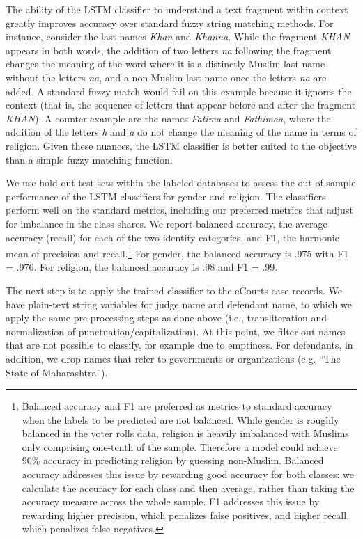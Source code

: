 \documentclass[12pt,english]{article}
\begin{document}
The ability of the LSTM classifier to understand a text fragment within context greatly improves accuracy over standard fuzzy string matching methods. For instance, consider the last names \textit{Khan} and \textit{Khanna}. While the fragment \textit{KHAN} appears in both words, the addition of two letters \textit{na} following the fragment changes the meaning of the word where it is a distinctly Muslim last name without the letters \textit{na}, and a non-Muslim last name once the letters \textit{na} are added. A standard fuzzy match would fail on this example because it ignores the context (that is, the sequence of letters that appear before and after the fragment \textit{KHAN}). A counter-example are the names \textit{Fatima} and \textit{Fathimaa}, where the addition of the letters \textit{h} and \textit{a} do not change the meaning of the name in terms of religion. Given these nuances, the LSTM classifier is better suited to the objective than a simple fuzzy matching function.

We use hold-out test sets within the labeled databases to assess the out-of-sample performance of the LSTM classifiers for gender and religion. The classifiers perform well on the standard metrics, including our preferred metrics that adjust for imbalance in the class shares. We report balanced accuracy, the average accuracy (recall) for each of the two identity categories, and F1, the harmonic mean of precision and recall.\footnote{Balanced accuracy and F1 are preferred as metrics to standard accuracy when the labels to be predicted are not balanced. While gender is roughly balanced in the voter rolls data, religion is heavily imbalanced with Muslims only comprising one-tenth of the sample. Therefore a model could achieve 90\% accuracy in predicting religion by guessing non-Muslim. Balanced accuracy addresses this issue by rewarding good accuracy for both classes: we calculate the accuracy for each class and then average, rather than taking the accuracy measure across the whole sample. F1 addresses this issue by rewarding higher precision, which penalizes false positives, and higher recall, which penalizes false negatives.}  For gender, the balanced accuracy is .975 with F1 = .976. For religion, the balanced accuracy is .98 and F1 = .99.

The next step is to apply the trained classifier to the eCourts case records. We have plain-text string variables for judge name and defendant name, to which we apply the same pre-processing steps as done above (i.e., transliteration and normalization of punctuation/capitalization). At this point, we filter out names that are not possible to classify, for example due to emptiness. For defendants, in addition, we drop names that refer to governments or organizations (e.g. “The State of Maharashtra”). 
\end{document}
